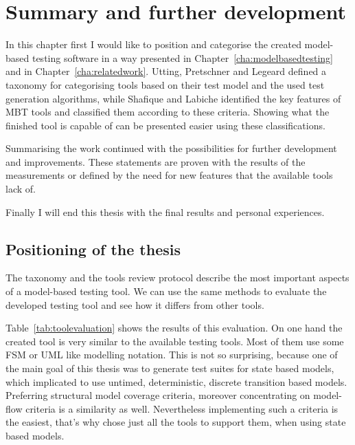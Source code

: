 \chapter{Summary and further development}
\label{cha:summary}

In this chapter first I would like to position and categorise the created model-based testing software in a way presented in Chapter~\ref{cha:modelbasedtesting} and in Chapter~\ref{cha:relatedwork}. Utting, Pretschner and Legeard \cite{taxonomy} defined a taxonomy for categorising tools based on their test model and the used test generation algorithms, while Shafique and Labiche \cite{toolsreview} identified the key features of MBT tools and classified them according to these criteria. Showing what the finished tool is capable of can be presented easier using these classifications.

Summarising the work continued with the possibilities for further development and improvements. These statements are proven with the results of the measurements or defined by the need for new features that the available tools lack of.

Finally I will end this thesis with the final results and personal experiences.

\section{Positioning of the thesis}
\label{sec:positioning}

The taxonomy and the tools review protocol describe the most important aspects of a model-based testing tool. We can use the same methods to evaluate the developed testing tool and see how it differs from other tools.

Table~\ref{tab:toolevaluation} shows the results of this evaluation. On one hand the created tool is very similar to the available testing tools. Most of them use some FSM or UML like modelling notation. This is not so surprising, because one of the main goal of this thesis was to generate test suites for state based models, which implicated to use untimed, deterministic, discrete transition based models. Preferring structural model coverage criteria, moreover concentrating on model-flow criteria is a similarity as well. Nevertheless implementing such a criteria is the easiest, that's why chose just all the tools to support them, when using state based models.

